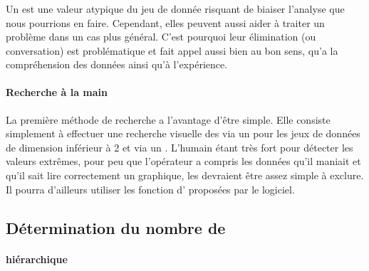 \subsubsection{}
Un  est une valeur atypique du jeu de donnée risquant de biaiser l'analyse que nous pourrions en faire. Cependant, elles peuvent aussi aider à traiter un problème dans un cas plus général. C'est pourquoi leur élimination (ou conversation) est problématique et fait appel aussi bien au bon sens, qu'a la compréhension des données ainsi qu'à l'expérience.

\paragraph{Recherche \og à la main\fg}
La première méthode de recherche a l'avantage d'être simple. Elle consiste simplement à effectuer une recherche visuelle des  via un  pour les jeux de données de dimension inférieur à 2 et via un . L'humain étant très fort pour détecter les valeurs extrêmes, pour peu que l'opérateur a compris les données qu'il maniait et qu'il sait lire correctement un graphique, les  devraient être assez simple à exclure. Il pourra d'ailleurs utiliser les fonction d' proposées par le logiciel.

\begin{multicols}{2}
	 \columnbreak
\end{multicols}


\subsection{Détermination du nombre de }

\paragraph{ hiérarchique}

